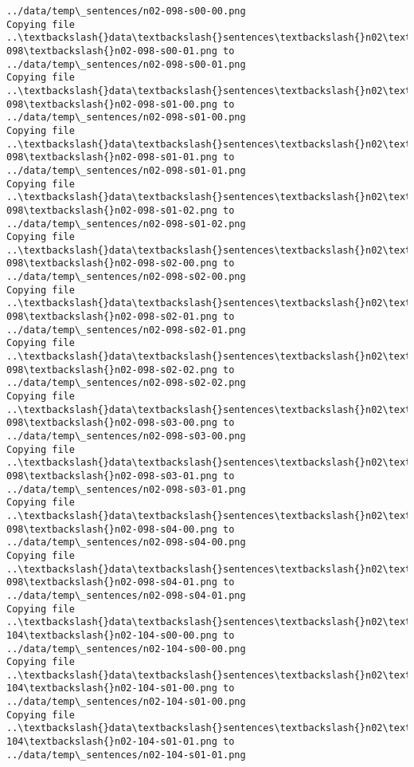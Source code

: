 \documentclass[11pt]{article}
\begin{document}
\begin{Verbatim}[commandchars=\\\{\}]
../data/temp\_sentences/n02-098-s00-00.png
Copying file ..\textbackslash{}data\textbackslash{}sentences\textbackslash{}n02\textbackslash{}n02-098\textbackslash{}n02-098-s00-01.png to
../data/temp\_sentences/n02-098-s00-01.png
Copying file ..\textbackslash{}data\textbackslash{}sentences\textbackslash{}n02\textbackslash{}n02-098\textbackslash{}n02-098-s01-00.png to
../data/temp\_sentences/n02-098-s01-00.png
Copying file ..\textbackslash{}data\textbackslash{}sentences\textbackslash{}n02\textbackslash{}n02-098\textbackslash{}n02-098-s01-01.png to
../data/temp\_sentences/n02-098-s01-01.png
Copying file ..\textbackslash{}data\textbackslash{}sentences\textbackslash{}n02\textbackslash{}n02-098\textbackslash{}n02-098-s01-02.png to
../data/temp\_sentences/n02-098-s01-02.png
Copying file ..\textbackslash{}data\textbackslash{}sentences\textbackslash{}n02\textbackslash{}n02-098\textbackslash{}n02-098-s02-00.png to
../data/temp\_sentences/n02-098-s02-00.png
Copying file ..\textbackslash{}data\textbackslash{}sentences\textbackslash{}n02\textbackslash{}n02-098\textbackslash{}n02-098-s02-01.png to
../data/temp\_sentences/n02-098-s02-01.png
Copying file ..\textbackslash{}data\textbackslash{}sentences\textbackslash{}n02\textbackslash{}n02-098\textbackslash{}n02-098-s02-02.png to
../data/temp\_sentences/n02-098-s02-02.png
Copying file ..\textbackslash{}data\textbackslash{}sentences\textbackslash{}n02\textbackslash{}n02-098\textbackslash{}n02-098-s03-00.png to
../data/temp\_sentences/n02-098-s03-00.png
Copying file ..\textbackslash{}data\textbackslash{}sentences\textbackslash{}n02\textbackslash{}n02-098\textbackslash{}n02-098-s03-01.png to
../data/temp\_sentences/n02-098-s03-01.png
Copying file ..\textbackslash{}data\textbackslash{}sentences\textbackslash{}n02\textbackslash{}n02-098\textbackslash{}n02-098-s04-00.png to
../data/temp\_sentences/n02-098-s04-00.png
Copying file ..\textbackslash{}data\textbackslash{}sentences\textbackslash{}n02\textbackslash{}n02-098\textbackslash{}n02-098-s04-01.png to
../data/temp\_sentences/n02-098-s04-01.png
Copying file ..\textbackslash{}data\textbackslash{}sentences\textbackslash{}n02\textbackslash{}n02-104\textbackslash{}n02-104-s00-00.png to
../data/temp\_sentences/n02-104-s00-00.png
Copying file ..\textbackslash{}data\textbackslash{}sentences\textbackslash{}n02\textbackslash{}n02-104\textbackslash{}n02-104-s01-00.png to
../data/temp\_sentences/n02-104-s01-00.png
Copying file ..\textbackslash{}data\textbackslash{}sentences\textbackslash{}n02\textbackslash{}n02-104\textbackslash{}n02-104-s01-01.png to
../data/temp\_sentences/n02-104-s01-01.png

\end{Verbatim}
\end{document}
